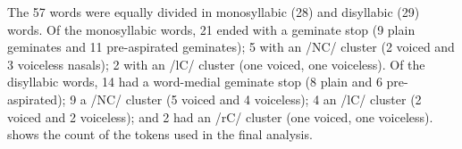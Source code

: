 \documentclass[11pt,a4paper,oneside,openany]{memoir}\usepackage[]{graphicx}\usepackage[]{color}
\begin{document}
The 57 words were equally divided in monosyllabic (28) and disyllabic (29) words.
Of the monosyllabic words, 21 ended with a geminate stop (9 plain geminates and 11 pre-aspirated geminates); 5 with an /NC/ cluster (2 voiced and 3 voiceless nasals); 2 with an /lC/ cluster (one voiced, one voiceless).
Of the disyllabic words, 14 had a word-medial geminate stop (8 plain and 6 pre-aspirated); 9 a /NC/ cluster (5 voiced and 4 voiceless); 4 an /lC/ cluster (2 voiced and 2 voiceless); and 2 had an /rC/ cluster (one voiced, one voiceless).
 shows the count of the tokens used in the final analysis.




\vspace{2em}

\label{t:wordlist}
\end{document}
